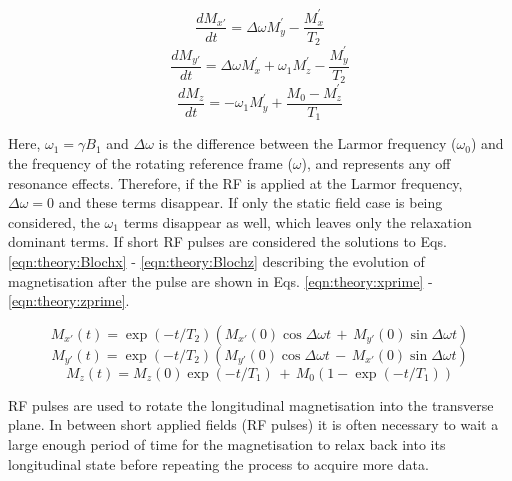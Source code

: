 \begin{equation}
    \frac{dM_{x'}}{dt} = \Delta\omega M_y^{'} - \frac{M_x^{'}}{T_2}
    \label{eqn:theory:Blochx}
\end{equation}
\begin{equation}
    \frac{dM_{y'}}{dt} = \Delta\omega M_x^{'} + \omega_1M_z^{'} - \frac{M_y^{'}}{T_2}
    \label{eqn:theory:Blochy}
\end{equation}
\begin{equation}
    \frac{dM_z}{dt} = -\omega_1M_y^{'} + \frac{M_0-M_z^{'}}{T_1}
    \label{eqn:theory:Blochz}
\end{equation}

Here, $\omega_1=\gamma B_1$ and $\Delta\omega$ is the difference between the Larmor frequency ($\omega_0$) and the frequency of the rotating reference frame ($\omega$), and represents any off resonance effects. Therefore, if the \ac{RF} is applied at the Larmor frequency, $\Delta\omega=0$ and these terms disappear. If only the static field case is being considered, the $\omega_1$ terms disappear as well, which leaves only the relaxation dominant terms. If short \ac{RF} pulses are considered the solutions to Eqs. \ref{eqn:theory:Blochx} - \ref{eqn:theory:Blochz} describing the evolution of magnetisation after the pulse are shown in Eqs. \ref{eqn:theory:xprime} - \ref{eqn:theory:zprime}.

\begin{equation}
    M_{x'}(t) = \exp(-t/T_2) \left( M_{x'}(0)\cos\Delta\omega t \, + \, M_{y'}(0)\sin\Delta\omega t \right)
    \label{eqn:theory:xprime}
\end{equation}
\begin{equation}
    M_{y'}(t) = \exp(-t/T_2) \left( M_{y'}(0)\cos\Delta\omega t \, - \, M_{x'}(0)\sin\Delta\omega t \right)
\end{equation}
\begin{equation}
    M_z(t) = M_z(0)\exp(-t/T_1) \, + \, M_0 \left( 1-\exp(-t/T_1) \right)
    \label{eqn:theory:zprime}
\end{equation}

RF pulses are used to rotate the longitudinal magnetisation into the transverse plane. In between short applied fields (\ac{RF} pulses) it is often necessary to wait a large enough period of time for the magnetisation to relax back into its longitudinal state before repeating the process to acquire more data. 


